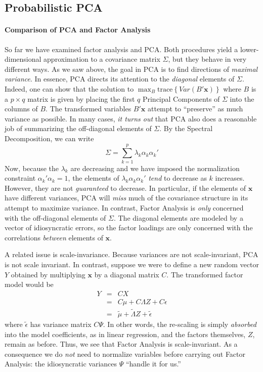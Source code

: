 \subsection{Probabilistic PCA}

\paragraph{Comparison of PCA and Factor Analysis}
So far we have examined factor analysis and PCA. Both procedures yield a lower-dimensional approximation to a covariance matrix $\Sigma$, but they behave in very different ways. As we saw above, the goal in PCA is to find directions of \emph{maximal variance}. In essence, PCA directs its attention to the \emph{diagonal} elements of $\Sigma$. Indeed, one can show that the solution to $\max_B \mbox{trace}\left\{Var(B'\mathbf{x}) \right\}$ where $B$ is a $p \times q$ matrix is given by placing the first $q$ Principal Components of $\Sigma$ into the columns of $B$. The transformed variables $B'\mathbf{x}$ attempt to ``preserve'' as much variance as possible. In many cases, \emph{it turns out} that PCA also does a reasonable job of summarizing the off-diagonal elements of $\Sigma$. By the Spectral Decomposition, we can write
	$$\Sigma = \sum_{k=1}^p \lambda_k \alpha_k \alpha_k'$$
Now, because the $\lambda_k$ are decreasing and we have imposed the normalization constraint $\alpha_k'\alpha_k =1$, the elements of $\lambda_k \alpha_k \alpha_k'$ \emph{tend} to decrease as $k$ increases. However, they are not \emph{guaranteed} to decrease. In particular, if the elements of $\mathbf{x}$ have different variances, PCA will \emph{miss} much of the covariance structure in its attempt to maximize variance. In contrast, Factor Analysis is \emph{only} concerned with the off-diagonal elements of $\Sigma$. The diagonal elements are modeled by a vector of idiosyncratic errors, so the factor loadings are only concerned with the correlations \emph{between} elements of $\mathbf{x}$.

A related issue is scale-invariance. Because variances are not scale-invariant, PCA is not scale invariant. In contrast, suppose we were to define a new random vector $Y$ obtained by multiplying $\mathbf{x}$ by a diagonal matrix $C$. The transformed factor model would be
	\begin{eqnarray*}
		Y &=& C X\\
			&=& C\mu + C\Lambda Z + C\epsilon\\
			&=& \widetilde{\mu} + \widetilde{\Lambda}Z + \widetilde{\epsilon}
	\end{eqnarray*}
where $\widetilde{\epsilon}$ has variance matrix $C\Psi$. In other words, the re-scaling is simply \emph{absorbed} into the model coefficients, as in linear regression, and the factors themselves, $Z$, remain as before. Thus, we see that Factor Analysis is scale-invariant. As a consequence we do \emph{not} need to normalize variables before carrying out Factor Analysis: the idiosyncratic variances $\Psi$ ``handle it for us.''

